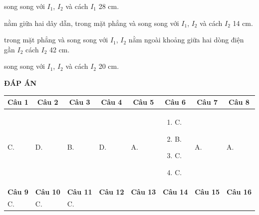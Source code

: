 \begin{enumerate}
{		
	}
\end{enumerate}

\textbf{ĐÁP ÁN}
\begin{longtable}[\textwidth]{|m{}|m{}|m{}|m{}|m{}|m{}|m{}|m{}|}
	\hline%
	\multicolumn{1}{|c}{\textbf{Câu 1}} & \multicolumn{1}{|c|}{\textbf{Câu 2}} & \multicolumn{1}{c|}{\textbf{Câu 3}} &
	\multicolumn{1}{c|}{\textbf{Câu 4}} &
	\multicolumn{1}{c|}{\textbf{Câu 5}} &
	\multicolumn{1}{c|}{\textbf{Câu 6}} &
	\multicolumn{1}{c|}{\textbf{Câu 7}} &
	\multicolumn{1}{c|}{\textbf{Câu 8}}  \\
	\hline
	C.&D. &B. &D. &A. &\begin{enumerate}[label=\alph*)]
		\item C.
		\item B.
		\item C.
		\item C.
	\end{enumerate}&A. &A.\\
	\hline
	
	\multicolumn{1}{|c|}{\textbf{Câu 9}} & \multicolumn{1}{c|}{\textbf{Câu 10}} & \multicolumn{1}{c|}{\textbf{Câu 11}} &
	\multicolumn{1}{c|}{\textbf{Câu 12}} &
	\multicolumn{1}{c|}{\textbf{Câu 13}} &
	\multicolumn{1}{c|}{\textbf{Câu 14}} &
	\multicolumn{1}{c|}{\textbf{Câu 15}} &
	\multicolumn{1}{c|}{\textbf{Câu 16}} \\
	\hline
	C. &C. &C. & && & &	\\
	\hline
\end{longtable}


